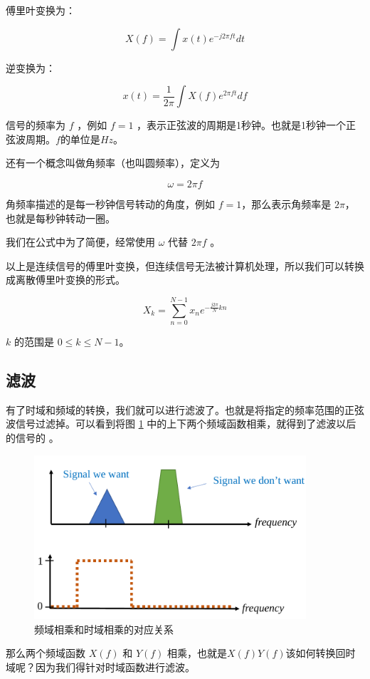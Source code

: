 \documentclass[lang=cn,newtx,10pt,scheme=chinese]{elegantbook}
\begin{document}
傅里叶变换为：

$$
X(f) = \int{x(t)e^{-j 2 \pi f t}}dt
$$

逆变换为：

$$
x(t) = \frac{1}{2\pi}\int X(f)e^{2\pi ft}df
$$

信号的频率为 $f$ ，例如 $f=1$ ，表示正弦波的周期是1秒钟。也就是1秒钟一个正弦波周期。$f$的单位是$Hz$。

还有一个概念叫做角频率（也叫圆频率），定义为

$$
\omega = 2\pi f
$$

角频率描述的是每一秒钟信号转动的角度，例如 $f=1$，那么表示角频率是 $2\pi$，也就是每秒钟转动一圈。

我们在公式中为了简便，经常使用 $\omega$ 代替 $2\pi f$ 。

以上是连续信号的傅里叶变换，但连续信号无法被计算机处理，所以我们可以转换成离散傅里叶变换的形式。

$$
X_k = \sum_{n=0}^{N-1}x_n e^{-\frac{j2\pi}{N}kn}
$$

$k$ 的范围是 $0 \leq k \leq N-1$。

\subsection{滤波}

有了时域和频域的转换，我们就可以进行滤波了。也就是将指定的频率范围的正弦波信号过滤掉。可以看到将图 \ref{fig:filter} 中的上下两个频域函数相乘，就得到了滤波以后的信号的  。

\begin{figure}[!htb]
\centering
\includegraphics[width=0.9\textwidth]{filter.pdf}
\caption{频域相乘和时域相乘的对应关系}
\label{fig:filter}
\end{figure}

那么两个频域函数 $X(f)$ 和 $Y(f)$ 相乘，也就是$X(f)Y(f)$该如何转换回时域呢？因为我们得针对时域函数进行滤波。
\end{document}
